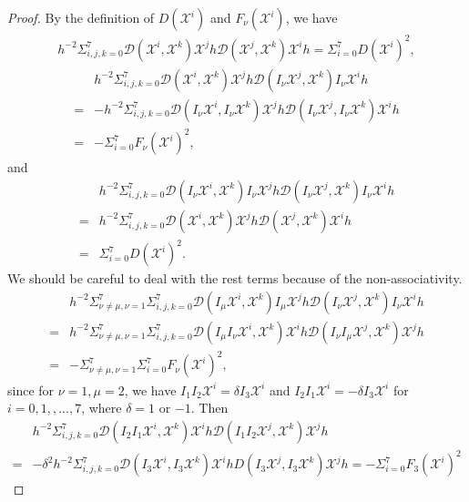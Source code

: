 \documentclass[reqno,12pt]{amsart}
\numberwithin{equation}{section}
\theoremstyle{plain}
\theoremstyle{definition}
\begin{document}
\begin{proof}
By the definition of $D(\mathscr{X}^i)$ and $F_\nu(\mathscr{X}^i)$, we have
\begin{align*}
    h^{-2}\Sigma_{i,j,k=0}^7\mathcal{D}(\mathscr{X}^i,\mathscr{X}^k)\mathscr{X}^j h \mathcal{D}(\mathscr{X}^j,\mathscr{X}^k)\mathscr{X}^i h=\Sigma_{i=0}^7D(\mathscr{X}^i)^2,\end{align*}
\begin{align*}
    &h^{-2}\Sigma_{i,j,k=0}^7\mathcal{D}(\mathscr{X}^i,\mathscr{X}^k)\mathscr{X}^j h \mathcal{D}(I_\nu\mathscr{X}^j,\mathscr{X}^k)I_\nu\mathscr{X}^i h\\=&-h^{-2}\Sigma_{i,j,k=0}^7\mathcal{D}(I_\nu\mathscr{X}^i,I_\nu\mathscr{X}^k)\mathscr{X}^j h \mathcal{D}(I_\nu\mathscr{X}^j,I_\nu\mathscr{X}^k)\mathscr{X}^i h\\=&-\Sigma_{i=0}^7F_\nu(\mathscr{X}^i)^2,\end{align*}
and
\begin{align*}
    &h^{-2}\Sigma_{i,j,k=0}^7\mathcal{D}(I_\nu \mathscr{X}^i,\mathscr{X}^k)I_\nu\mathscr{X}^j h \mathcal{D}(I_\nu \mathscr{X}^j,\mathscr{X}^k)I_\nu\mathscr{X}^i h\\=& h^{-2}\Sigma_{i,j,k=0}^7\mathcal{D}(\mathscr{X}^i,\mathscr{X}^k)\mathscr{X}^j h \mathcal{D}(\mathscr{X}^j,\mathscr{X}^k)\mathscr{X}^i h\\=&\Sigma_{i=0}^7D(\mathscr{X}^i)^2.\end{align*}
We should be careful to deal with the rest terms because of the non-associativity.
\begin{align*}
    &h^{-2}\Sigma_{\nu\neq \mu,\nu=1}^7\Sigma_{i,j,k=0}^7\mathcal{D}(I_\mu \mathscr{X}^i,\mathscr{X}^k)I_\mu \mathscr{X}^j h \mathcal{D}(I_\nu\mathscr{X}^j,\mathscr{X}^k)I_\nu\mathscr{X}^i h\\=&h^{-2}\Sigma_{\nu\neq \mu,\nu=1}^7\Sigma_{i,j,k=0}^7\mathcal{D}(I_\mu I_\nu \mathscr{X}^i,\mathscr{X}^k) \mathscr{X}^i h \mathcal{D}(I_\nu I_\mu \mathscr{X}^j,\mathscr{X}^k)\mathscr{X}^j h\\=  
    &-\Sigma_{\nu\neq \mu, \nu=1}^7\Sigma_{i=0}^7F_\nu(\mathscr{X}^i)^2,\end{align*}
since for $\nu=1,\mu=2$,
we have $I_1I_2\mathscr{X}^i=\delta I_3\mathscr{X}^i$ and $I_2I_1\mathscr{X}^i=-\delta I_3\mathscr{X}^i$ for $i=0,1,,...,7$, where $\delta=1$ or $-1$. Then
\begin{align*}
&h^{-2}\Sigma_{i,j,k=0}^7\mathcal{D}(I_2 I_1 \mathscr{X}^i,\mathscr{X}^k) \mathscr{X}^i h \mathcal{D}(I_1 I_2 \mathscr{X}^j,\mathscr{X}^k)\mathscr{X}^j h\\=& -\delta^2h^{-2}\Sigma_{i,j,k=0}^7\mathcal{D}(I_3\mathscr{X}^i,I_3\mathscr{X}^k)\mathscr{X}^i hD(I_3\mathscr{X}^j,I_3\mathscr{X}^k)\mathscr{X}^jh=-\Sigma_{i=0}^7F_3(\mathscr{X}^i)^2
\end{align*}







\end{proof}
\end{document}
